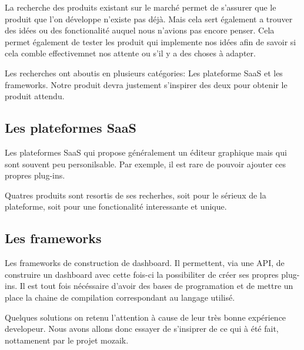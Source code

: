 La recherche des produits existant sur le marché permet de s'assurer que le produit que l'on développe n'existe pas déjà. Mais cela sert également a trouver des idées ou des fonctionalité auquel nous n'avions pas encore penser. Cela permet également de tester les produit qui implemente nos idées afin de savoir si cela comble effectivemnet nos attente ou s'il y a des choses à adapter.

Les recherches ont aboutis en plusieurs catégories: Les plateforme \gls{SaaS} et les \glspl{framework}. Notre produit devra justement s'inspirer des deux pour obtenir le produit attendu.


\subsection{Les plateformes \gls{SaaS}}

  Les plateformes \gls{SaaS} qui propose généralement un éditeur graphique mais qui sont souvent peu personilsable. Par exemple, il est rare de pouvoir ajouter ces propres plug-ins.

  Quatres produits sont resortis de ses recherhes, soit pour le sérieux de la plateforme, soit pour une fonctionalité interessante et unique.

\subsection{Les \glspl{framework} }

  Les \glspl{framework} de construction de dashboard. Il permettent, via une \gls{API}, de construire un dashboard avec cette fois-ci la possibiliter de créer ses propres plug-ins. Il est tout fois nécéssaire d'avoir des bases de programation et de mettre un place la chaine de compilation correspondant au langage utilisé.

  Quelques solutions on retenu l'attention à cause de leur très bonne expérience developeur. Nous avons allons donc essayer de s'insiprer de ce qui à été fait, nottamenent par le projet mozaik.